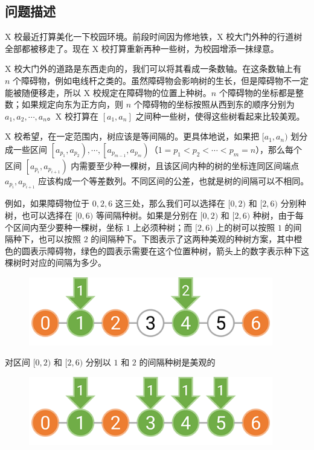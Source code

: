 \subsection*{问题描述}

X 校最近打算美化一下校园环境。前段时间因为修地铁，X 校大门外种的行道树全部都被移走了。现在 X 校打算重新再种一些树，为校园增添一抹绿意。

X 校大门外的道路是东西走向的，我们可以将其看成一条数轴。在这条数轴上有 $n$ 个障碍物，例如电线杆之类的。虽然障碍物会影响树的生长，但是障碍物不一定能被随便移走，所以 X 校规定在障碍物的位置上{}种树。$n$ 个障碍物的坐标都是整数；如果规定向东为正方向，则 $n$ 个障碍物的坐标按照从西到东的顺序分别为 $a_1, a_2, \cdots, a_n$。X 校打算在 $\left[a_1, a_n\right]$ 之间种一些树，使得这些树看起来比较美观。

X 校希望，在一定范围内，树应该是等间隔的。更具体地说，如果把 $[a_1, a_n)$ 划分成一些区间 $\left[a_{p_1}, a_{p_2}\right),\cdots,\left[a_{p_{m-1}},a_{p_m}\right)$（$1=p_1<p_2<\cdots<p_m=n$），那么每个区间 $\left[a_{p_i},a_{p_{i+1}}\right)$ 内需要至少种一棵树，且该区间内种的树的坐标连同区间端点 $a_{p_i}, a_{p_{i+1}}$ 应该构成一个等差数列。不同区间的公差，也就是树的间隔可以不相同。

例如，如果障碍物位于 $0, 2, 6$ 这三处，那么我们可以选择在 $[0, 2)$ 和 $[2, 6)$ 分别种树，也可以选择在 $[0, 6)$ 等间隔种树。如果是分别在 $[0, 2)$ 和 $[2, 6)$ 种树，由于每个区间内至少要种一棵树，坐标 $1$ 上必须种树；而 $[2, 6)$ 上的树可以按照 $1$ 的间隔种下，也可以按照 $2$ 的间隔种下。下图表示了这两种美观的种树方案，其中橙色的圆表示障碍物，绿色的圆表示需要在这个位置种树，箭头上的数字表示种下这棵树时对应的间隔为多少。

\begin{figure}[H]
    \centering
    \includegraphics[width=0.95\textwidth]{image/22/4-p-1.png}
\end{figure}

对区间 $[0, 2)$ 和 $[2, 6)$ 分别以 $1$ 和 $2$ 的间隔种树是美观的

\begin{figure}[H]
    \centering
    \includegraphics[width=0.95\textwidth]{image/22/4-p-2.png}
\end{figure}

